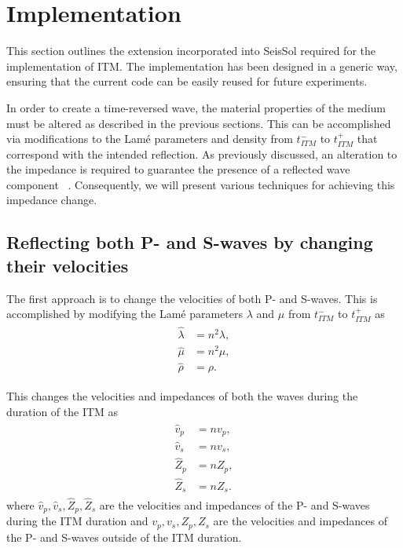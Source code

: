 \section{Implementation}\label{section:Implementation}

This section outlines the extension incorporated into SeisSol required for the implementation of \ac{ITM}. The implementation has been designed in a generic way,
ensuring that the current code can be easily reused for future experiments.

In order to create a time-reversed wave, the material properties of the medium must be altered as described in the previous sections. This can be accomplished via
modifications to the Lam\'{e} parameters and density from $t_{ITM}^-$ to $t_{ITM}^+$ that correspond with the intended reflection. As previously discussed, an alteration
to the impedance is required to guarantee the presence of a reflected wave component ~\parencite[Sec 9.8]{leveque_2002}. Consequently, we will present various techniques
for achieving this impedance change.

\subsection{Reflecting both P- and S-waves by changing their velocities}\label{sec:reflecting_both}
The first approach is to change the velocities of both P- and S-waves. This is accomplished by modifying the Lam\'{e} parameters $\lambda$ and $\mu$ from $t_{ITM}^-$ to $t_{ITM}^+$ as
\begin{align}
    \begin{split}
        \hat{\lambda} &= n^2 \lambda , \\
        \hat{\mu} &= n^2 \mu ,\\
        \hat{\rho} &= \rho .
    \end{split}
\end{align}

This changes the velocities and impedances of both the waves during the duration of the \ac{ITM} as
\begin{align}
    \begin{split}
        \hat{v}_p &= n v_p ,\\
        \hat{v}_s &= n v_s ,\\
        \hat{Z}_p &= n Z_p ,\\
        \hat{Z}_s &= n Z_s .
    \end{split}
\end{align}
where $\hat{v}_p, \hat{v}_s, \hat{Z}_p, \hat{Z}_s$ are the velocities and impedances of the P- and S-waves during the \ac{ITM} duration and 
$v_p, v_s, Z_p, Z_s$ are the velocities and impedances of the P- and S-waves outside of the \ac{ITM} duration.

